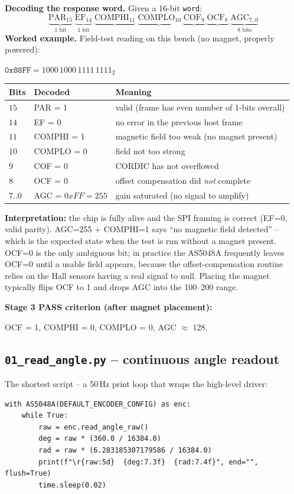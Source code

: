 \documentclass[11pt,a4paper]{article}
\begin{document}
\textbf{Decoding the response word.}  Given a 16-bit \texttt{word}:
\[
\underbrace{\text{PAR}_{15}}_{1\text{ bit}}\;
\underbrace{\text{EF}_{14}}_{1\text{ bit}}\;
\underbrace{\text{COMPHI}_{11}}_{}\;
\underbrace{\text{COMPLO}_{10}}_{}\;
\underbrace{\text{COF}_{9}}_{}\;
\underbrace{\text{OCF}_{8}}_{}\;
\underbrace{\text{AGC}_{7..0}}_{8\text{ bits}}
\]
\textbf{Worked example.}  Field-test reading on this bench
(no magnet, properly powered):
\begin{center}\small
\(\texttt{0x88FF} = 1000\,1000\,1111\,1111_2\)
\end{center}
\begin{center}\small
\begin{tabular}{lll}
\toprule
Bits & Decoded & Meaning \\
\midrule
$15$    & PAR    = 1 & valid (frame has even number of 1-bits overall) \\
$14$    & EF     = 0 & no error in the previous host frame \\
$11$    & COMPHI = 1 & magnetic field too weak (no magnet present) \\
$10$    & COMPLO = 0 & field not too strong \\
$9$     & COF    = 0 & CORDIC has not overflowed \\
$8$     & OCF    = 0 & offset compensation did \emph{not} complete \\
$7..0$  & AGC    = $0xFF=255$ & gain saturated (no signal to amplify) \\
\bottomrule
\end{tabular}
\end{center}
\textbf{Interpretation:} the chip is fully alive and the SPI framing
is correct (EF=0, valid parity).  AGC=255 + COMPHI=1 says ``no
magnetic field detected'' -- which is the expected state when the test
is run without a magnet present.  OCF=0 is the only ambiguous bit; in
practice the AS5048A frequently leaves OCF=0 until a usable field
appears, because the offset-compensation routine relies on the Hall
sensors having a real signal to null.  Placing the magnet typically
flips OCF to 1 and drops AGC into the 100--200 range.

\textbf{Stage 3 PASS criterion (after magnet placement):}
\begin{center}\small
OCF = 1, COMPHI = 0, COMPLO = 0, AGC $\approx$ 128.
\end{center}

\subsection{\texttt{01\_read\_angle.py} -- continuous angle readout}
The shortest script -- a 50\,Hz print loop that wraps the high-level
driver:
\begin{lstlisting}
with AS5048A(DEFAULT_ENCODER_CONFIG) as enc:
    while True:
        raw = enc.read_angle_raw()
        deg = raw * (360.0 / 16384.0)
        rad = raw * (6.283185307179586 / 16384.0)
        print(f"\r{raw:5d}  {deg:7.3f}  {rad:7.4f}", end="", flush=True)
        time.sleep(0.02)
\end{lstlisting}
\end{document}

